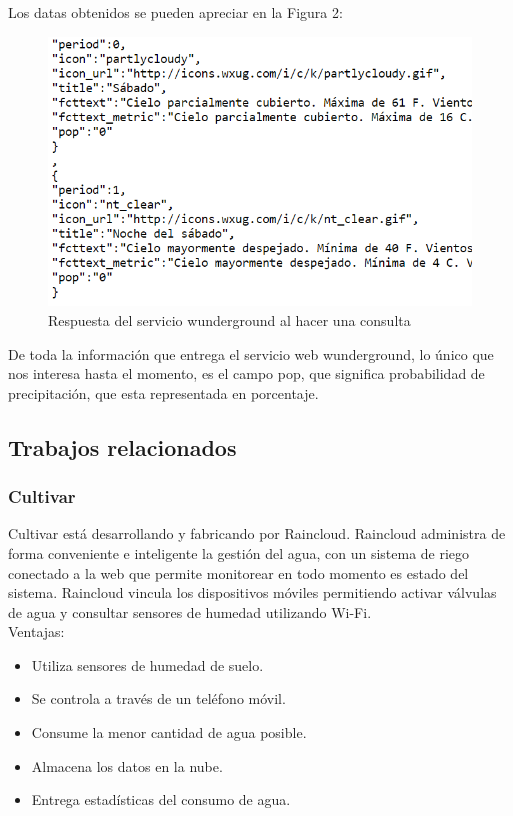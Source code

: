 \documentclass[11pt,letterpaper]{article}
\begin{document}
Los datas obtenidos se pueden apreciar en la Figura 2:

\begin{figure}[ht]
\caption{Respuesta del servicio wunderground al hacer una consulta}
\centering
\includegraphics[width=13cm]{response}
\end{figure}

\newpage

De toda la información que entrega el servicio web wunderground, lo único que nos interesa hasta el momento, es el campo pop, que significa probabilidad de precipitación, que esta representada en porcentaje.



\subsection{Trabajos relacionados}

\subsubsection{Cultivar}

Cultivar está desarrollando y fabricando por Raincloud\citep{raincloud}. Raincloud administra de forma conveniente e inteligente la gestión del agua, con un sistema de riego conectado a la web que permite monitorear en todo momento es estado del sistema. Raincloud vincula los dispositivos móviles permitiendo activar válvulas de agua y consultar sensores de humedad utilizando Wi-Fi.\\

Ventajas:
\begin{itemize}
\item Utiliza sensores de humedad de suelo.
\item Se controla a través de un teléfono móvil.
\item Consume la menor cantidad de agua posible.
\item Almacena los datos en la nube.
\item Entrega estadísticas del consumo de agua.
\end{itemize}
\end{document}
